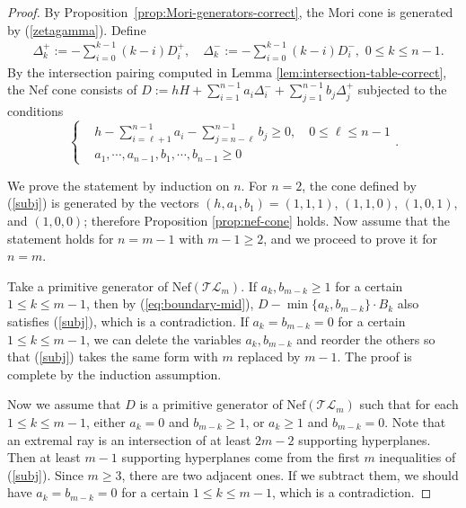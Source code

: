 \documentclass[10pt]{amsart}
\theoremstyle{definition}
\theoremstyle{plain} %
\begin{document}
\begin{proof} By Proposition~\ref{prop:Mori-generators-correct}, the Mori cone is generated by (\ref{zetagamma}). Define
\begin{equation}\label{dell}
\begin{split}
&\Delta^+_k:=-\sum\nolimits_{i=0}^{k-1}(k-i)D^+_i,\,\,\,\,\,\,\Delta^-_k:=-\sum\nolimits_{i=0}^{k-1}(k-i)D^-_i,\,\,0\leq k\leq n-1.
\end{split}
\end{equation} 
By the intersection pairing computed in Lemma \ref{lem:intersection-table-correct}, the Nef cone consists of $D:=hH+\sum\nolimits_{i=1}^{n-1}a_i\Delta_i^-+\sum\nolimits_{j=1}^{n-1}b_j\Delta_j^+$ subjected to the conditions
\begin{equation}\label{subj}
\left\{\begin{aligned}
&h-\sum\nolimits_{i=\ell+1}^{n-1}a_i-\sum\nolimits_{j=n-\ell}^{n-1}b_j\geq0,\,\,\,\,\,\,0\leq \ell\leq n-1\\
&a_1,\cdots,a_{n-1},b_1,\cdots,b_{n-1}\geq 0
\end{aligned}\right..
\end{equation}

We prove the statement by induction on $n$. For $n=2$, the cone defined by (\ref{subj}) is generated by the vectors $(h,a_1,b_1) = (1,1,1)$, $(1,1,0)$, $(1,0,1)$, and $(1,0,0)$; therefore Proposition \ref{prop:nef-cone} holds. Now assume that the statement holds for $n=m-1$ with $m-1\geq 2$, and we proceed to prove it for $n=m$.

Take a primitive generator of $\mathrm{Nef}(\mathcal {TL}_{m})$. If $a_k,b_{m-k}\geq 1$ for a certain $1\leq k\leq m-1$, then by (\ref{eq:boundary-mid}), $D-\operatorname{min}\{a_k,b_{m-k}\}\cdot B_k$ also satisfies (\ref{subj}), which is a contradiction. If $a_k=b_{m-k}=0$ for a certain $1\leq k\leq m-1$, we can delete the variables $a_k,b_{m-k}$ and reorder the others so that (\ref{subj}) takes the same form with $m$ replaced by $m-1$. The proof is complete by the induction assumption.  

Now we assume that $D$ is a primitive generator of $\mathrm{Nef}(\mathcal {TL}_{m})$ such that for each $1\leq k\leq m-1$, either $a_k=0$ and $b_{m-k}\geq 1$, or $a_k\geq 1$ and $b_{m-k}=0$.
Note that an extremal ray is an intersection of at least $2m-2$ supporting hyperplanes.  Then at least $m-1$ supporting hyperplanes come from the first $m$ inequalities of (\ref{subj}). Since $m\geq 3$, there are two adjacent ones. If we subtract them, we should have $a_k=b_{m-k}=0$ for a certain $1\leq k\leq m-1$, which is a contradiction.
\end{proof}
\end{document}
